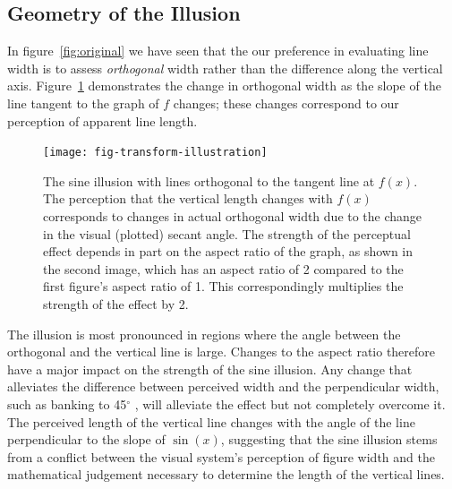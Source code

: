 \documentclass[11pt]{isuthesis}\usepackage[]{graphicx}\usepackage[]{color}
\begin{document}
\subsection{Geometry of the Illusion}\hfill\newline
In figure~\ref{fig:original} we have seen that the our preference in evaluating line width is to assess {\it orthogonal} width rather than the difference along the vertical axis. 
Figure~\ref{fig:OrthogonalWidth} demonstrates the change in orthogonal width as the slope of the line tangent to the graph of $f$ changes; these changes correspond to our perception of apparent line length. 

\begin{figure}[h!tbp]
\texttt{[image: fig-transform-illustration]}
\centering
\caption[Geometry of the sine illusion]{\label{fig:OrthogonalWidth} The sine illusion with lines orthogonal to the tangent line at $f(x)$. The perception that the vertical length changes with $f(x)$ corresponds to changes in actual orthogonal width due to the change in the visual (plotted) secant angle. The strength of the perceptual effect depends in part on the aspect ratio of the graph, as shown in the second image, which has an aspect ratio of 2 compared to the first figure's aspect ratio of 1. This correspondingly multiplies the strength of the effect by 2. 
}
\end{figure}
The illusion is most pronounced in regions where the angle between the orthogonal  and the vertical line is large. Changes to the aspect ratio therefore have a major impact on the strength of the sine illusion. Any change that alleviates the difference between perceived width and the perpendicular width, such as banking to 45$^\circ$ \citep{cleveland:88}, will alleviate the effect but not completely overcome it. 
The perceived length of the vertical line changes with the angle of the line perpendicular to the slope of $\sin(x)$, suggesting that the sine illusion stems from a conflict between the visual system's perception of figure width and the mathematical judgement necessary to determine the length of the vertical lines. 
\end{document}
